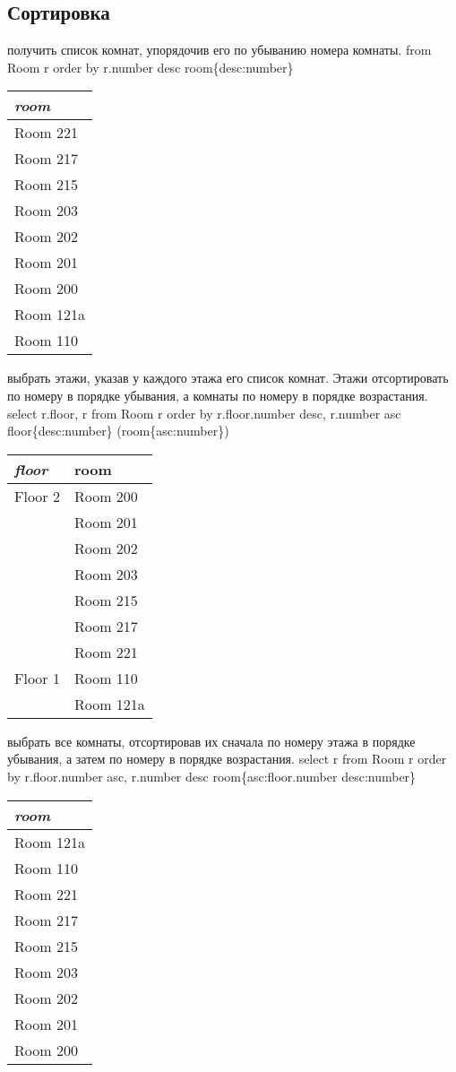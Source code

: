 \subsection{Сортировка}
\exastable
    {получить список комнат, упорядочив его по убыванию номера комнаты.}
    {from Room r order by r.number desc}
    {room\{desc:number\}}
    {\begin{tabular}{|l|}
	\hline
	\it {room} \\
	\hline
	\hline
	Room 221 \\
	\hline
	Room 217 \\ 
	\hline
	Room 215 \\
	\hline
	Room 203 \\
	\hline
	Room 202 \\
	\hline
	Room 201 \\
	\hline
	Room 200 \\
	\hline
	Room 121a \\
	\hline
	Room 110 \\	
	\hline
    \end{tabular}}

\exastable
    {выбрать этажи, указав у каждого этажа его список комнат. Этажи отсортировать 
    по номеру в порядке убывания, а комнаты по номеру в порядке возрастания.}
    {select r.floor, r from Room r order by r.floor.number desc, r.number asc}
    {floor\{desc:number\} (room\{asc:number\})}
    {\begin{tabular}{|l|l|}
	\hline
	\it {floor} & room\\
	\hline
	\hline
	Floor 2 & Room 200 \\
	\cline{2-2}
		& Room 201 \\ 
	\cline{2-2}
	    & Room 202 \\
	\cline{2-2}
	    & Room 203 \\
	\cline{2-2}
	    & Room 215 \\
	\cline{2-2}
	    & Room 217 \\
	\cline{2-2}
	    & Room 221 \\
	\hline
	Floor 1 & Room 110 \\
	\cline{2-2}
		& Room 121a \\	
	\hline
    \end{tabular}}

\exastable
    {выбрать все комнаты, отсортировав их сначала по номеру этажа в 
    порядке убывания, а затем по номеру в порядке возрастания.}
    {select r from Room r order by r.floor.number asc, r.number desc}
    {room\{asc:floor.number desc:number\}}
    {\begin{tabular}{|l|}
	\hline
	\it{room}\\
	\hline
	\hline
	Room 121a \\
	\hline
	Room 110 \\
	\hline
	Room 221 \\
	\hline
	Room 217 \\ 
	\hline
	Room 215 \\
	\hline
	Room 203 \\
	\hline
	Room 202 \\
	\hline
	Room 201 \\
	\hline
	Room 200 \\	
	\hline
    \end{tabular}}

\exastable
    {}
    {}
    {}
    {

    }


